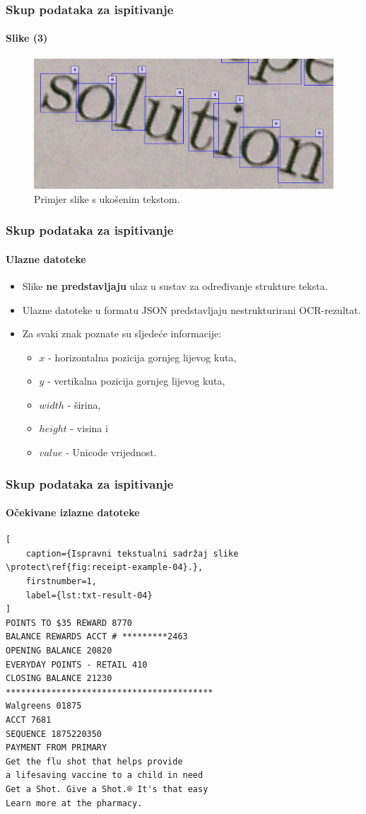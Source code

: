\documentclass{beamer}
\begin{document}
\begin{frame}
\frametitle{Skup podataka za ispitivanje}
\framesubtitle{Slike (3)}
\begin{figure}[htb]
    \centering
    \includegraphics[width=\textwidth]{images/book-example-04.png}
    \caption{Primjer slike s ukošenim tekstom.}
    \label{fig:book-example-04}
\end{figure}
\end{frame}
\begin{frame}
\frametitle{Skup podataka za ispitivanje}
\framesubtitle{Ulazne datoteke}
\begin{itemize}
    \item Slike \textbf{ne predstavljaju} ulaz u sustav za određivanje strukture teksta.
    \item Ulazne datoteke u formatu JSON predstavljaju nestrukturirani OCR-rezultat.
    \item Za svaki znak poznate su sljedeće informacije:
    \begin{itemize}
        \item $x$ - horizontalna pozicija gornjeg lijevog kuta,
        \item $y$ - vertikalna pozicija gornjeg lijevog kuta,
        \item $width$ - širina,
        \item $height$ - visina i
        \item $value$ - Unicode vrijednost.
    \end{itemize}
\end{itemize}
\end{frame}
\begin{frame}[fragile]
\frametitle{Skup podataka za ispitivanje}
\framesubtitle{Očekivane izlazne datoteke}
\begin{lstlisting}[
    caption={Ispravni tekstualni sadržaj slike \protect\ref{fig:receipt-example-04}.},
    firstnumber=1,
    label={lst:txt-result-04}
]
POINTS TO $35 REWARD 8770
BALANCE REWARDS ACCT # *********2463
OPENING BALANCE 20820
EVERYDAY POINTS - RETAIL 410
CLOSING BALANCE 21230
*****************************************
Walgreens 01875
ACCT 7681
SEQUENCE 1875220350
PAYMENT FROM PRIMARY
Get the flu shot that helps provide
a lifesaving vaccine to a child in need
Get a Shot. Give a Shot.® It's that easy
Learn more at the pharmacy.
\end{lstlisting}
\end{frame}
\end{document}
